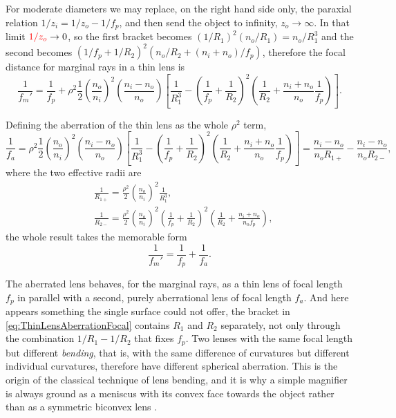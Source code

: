                 For moderate diameters we may replace, on the right hand side only, the paraxial relation $1/z_i = 1/z_o - 1/f_p$, and then send the object to infinity, $z_o\to\infty$. In that limit ${\color{red}1/z_o}\to0$, so the first bracket becomes $\left(1/R_1\right)^2\left(n_o/R_1\right) = n_o/R_1^3$ and the second becomes $\left( 1/f_p+1/R_2 \right)^2\left( n_o/R_2 + (n_i+n_o)/f_p \right)$, therefore the focal distance for marginal rays in a thin lens is
                \begin{equation}\label{eq:ThinLensMarginalFocal}
                    \frac{1}{f_m'} = \frac{1}{f_p} + \rho^2\frac{1}{2}\left( \frac{n_o}{n_i} \right)^2\left( \frac{n_i-n_o}{n_o} \right)\left[ \frac{1}{R_1^3} - \left( \frac{1}{f_p}+\frac{1}{R_2} \right)^2\left( \frac{1}{R_2}+\frac{n_i+n_o}{n_o}\frac{1}{f_p} \right) \right].
                \end{equation}

                Defining the aberration of the thin lens as the whole $\rho^2$ term,
                \begin{equation}\label{eq:ThinLensAberrationFocal}
                    \frac{1}{f_a} = \rho^2\frac{1}{2}\left( \frac{n_o}{n_i} \right)^2\left( \frac{n_i-n_o}{n_o} \right)\left[ \frac{1}{R_1^3} - \left( \frac{1}{f_p}+\frac{1}{R_2} \right)^2\left( \frac{1}{R_2}+\frac{n_i+n_o}{n_o}\frac{1}{f_p} \right) \right] = \frac{n_i-n_o}{n_oR_{1+}} - \frac{n_i-n_o}{n_oR_{2-}},
                \end{equation}
                where the two effective radii are
                \begin{align}
                    & \frac{1}{R_{1+}} = \frac{\rho^2}{2}\left( \frac{n_o}{n_i} \right)^2\frac{1}{R_1^3},\label{eq:R1plus}\\
                    & \frac{1}{R_{2-}} = \frac{\rho^2}{2}\left( \frac{n_o}{n_i} \right)^2\left( \frac{1}{f_p}+\frac{1}{R_2} \right)^2\left( \frac{1}{R_2}+\frac{n_i+n_o}{n_of_p} \right),\label{eq:R2minus}
                \end{align}
                the whole result takes the memorable form
                \begin{equation}\label{eq:ThinLensFocalSum}
                    \frac{1}{f_m'} = \frac{1}{f_p} + \frac{1}{f_a}.
                \end{equation}

                The aberrated lens behaves, for the marginal rays, as a thin lens of focal length $f_p$ in parallel with a second, purely aberrational lens of focal length $f_a$. And here appears something the single surface could not offer, the bracket in \ref{eq:ThinLensAberrationFocal} contains $R_1$ and $R_2$ separately, not only through the combination $1/R_1-1/R_2$ that fixes $f_p$. Two lenses with the same focal length but different \textit{bending}, that is, with the same difference of curvatures but different individual curvatures, therefore have different spherical aberration. This is the origin of the classical technique of lens bending, and it is why a simple magnifier is always ground as a meniscus with its convex face towards the object rather than as a symmetric biconvex lens \citep{kingslake2010lens}.

